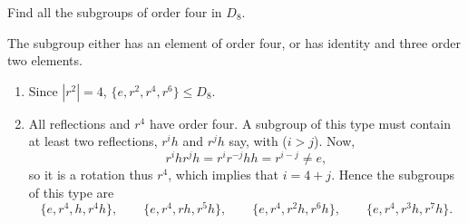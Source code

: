 \documentclass[letter-paper]{tufte-book}
\newenvironment{example}[1][Example]{\begin{trivlist}
\item[\hskip \labelsep {\bfseries #1}]}{\end{trivlist}}
\begin{document}
\begin{example}
  Find all the subgroups of order four in $D_8$.
  
  The subgroup either has an element of order four, or has identity and three 
  order two elements.
  \begin{enumerate}
    \item Since $|r^2|=4$, $\{e,r^2,r^4,r^6\}\leq D_8$.
    \item All reflections and $r^4$ have order four. A subgroup of this type 
    must contain at least two reflections, $r^i h$ and $r^j h$ say, with 
    ($i>j$). Now,
    \begin{equation*}
      r^i h r^j h=r^i r^{-j} hh=r^{i-j}\neq e,
    \end{equation*}
    so it is a rotation thus $r^4$, which implies that $i=4+j$. Hence the 
    subgroups of this type are
    \begin{equation*}
      \{e,r^4,h,r^4 h\},\qquad \{e,r^4,rh,r^5 h\},\qquad
      \{e,r^4,r^2 h,r^6 h\},\qquad \{e,r^4,r^3 h,r^7 h\}.
    \end{equation*}
  \end{enumerate}
\end{example}








\mainmatter




%


\end{document}
